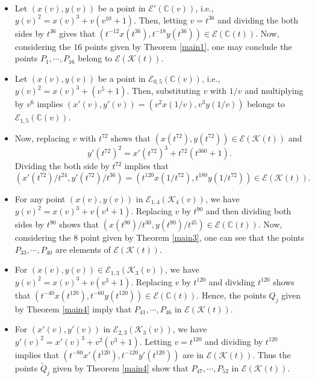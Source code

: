 \documentclass[11pt]{amsart}
\newcommand{\CC}{{\mathbb C}}
\newcommand{\Ee}{{\mathcal E}}
\newcommand{\KK}{{\mathcal K}}
\numberwithin{equation}{section}
\numberwithin{table}{section}
\newcommand\<{\langle}
\begin{document}
\begin{itemize}
	\item[(1)] Let $(x(v), y(v))$ be a point in $\Ee'(\CC(v))$, i.e.,
	$ y(v)^2=x(v)^3+ v (v^{10}+1)$. 
	Then, letting $v=t^{36}$ and dividing the both sides by $t^{36}$ gives that
	$\left( t^{-12} x(t^{36}), t^{-18} y(t^{36}) \right) \in \Ee (\CC(t)).$
	Now, considering the $16$ points given by Theorem \ref{main1}, one may conclude 
	the points $P_1, \cdots, P_{16}$ belong to $\Ee(\KK(t))$.
	
	
	
	\item[(2)] Let $(x(v), y(v))$ be a point in $\Ee_{0,5}(\CC(v))$, i.e.,
	$ y(v)^2=x(v)^3+  (v^5+1)$. Then, substituting $v$ with $1/v$ and multiplying  by $v^6$ implies $\left(x'(v), y'(v)\right) = (v^2 x(1/v), v^3 y(1/v))$ belongs to 
	$ \Ee_{1, 5}(\CC(v))$.
	
	\item[(3)]	
	Now, replacing $v$ with $t^{72}$ shows that
	$\left( x(t^{72}), y(t^{72}) \right) \in \Ee(\KK(t))$ and
	$$  y'(t^{72})^2=x'(t^{72})^3+ t^{72} (t^{360}+1).$$
	Dividing the both side by $t^{72}$ implies that  
	$$\left(x'(t^{72})/t^{24}, y'(t^{72})/t^{36}\right)= \left( t^{120} x(1/t^{72}),  t^{180} y(1/t^{72})\right) \in \Ee (\KK(t)).$$
	
	
	
	
	
	\item[(4)] For any point $(x(v), y(v))$  in $\Ee_{1, 4}(\KK_4(v))$, we have 
	$ y(v)^2=x(v)^3+  v (v^4+1)$. Replacing $v$ by $t^{90}$ and then dividing both sides by $t^{90}$ shows that  $\left(x(t^{90})/t^{30}, y(t^{90})/t^{45}\right) \in \Ee (\CC(t))$.
	Now, considering the $8$ point given by Theorem \ref{main3}, one can see that 
	the points $P_{33}, \cdots, P_{40}$  are elements of   $\Ee(\KK(t))$.
	
	
	\item[(5)]  For $(x(v), y(v)) \in \Ee_{1, 3} (\KK_3(v))$, 
	we have $ y(v)^2=x(v)^3+  v (v^3+1)$.
	Replacing $v$ by $t^{120}$ and dividing $t^{120}$ shows that
	$\left( t^{-40} x(t^{120}), t^{-60} y(t^{120})\right) \in  \Ee (\CC(t)).$ 
	Hence, the points $Q_j $  given by Theorem \ref{main4}  imply that
	$P_{41},\cdots, P_{46}$ in   $\Ee(\KK(t))$. 
	
	\item[(6)]	
	For	$(x'(v),y'(v))$ in $ \Ee_{2, 3}(\KK_3(v))$, we have   $ y'(v)^2=x'(v)^3+  v^2 (v^3+1)$.
	Letting $v=t^{120}$ and dividing by $t^{120}$ implies  that	$\left( t^{-80} x'(t^{120}), t^{-120}y'(t^{120})\right)$
	are in  $\Ee(\KK(t))$. Thus the points $\widetilde{Q}_j$  given by Theorem \ref{main4}
	show that  $P_{47},\cdots, P_{52}$ in   $\Ee(\KK(t))$.
	

\end{itemize}
\end{document}
